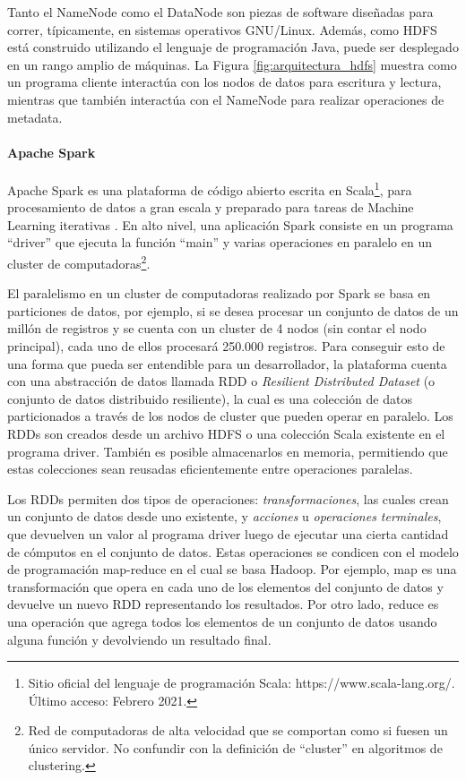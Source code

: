 \bigskip Tanto el NameNode como el DataNode son piezas de software diseñadas para correr, típicamente, en sistemas operativos GNU/Linux. Además, como HDFS está construido utilizando el lenguaje de programación Java, puede ser desplegado en un rango amplio de máquinas. La Figura \ref{fig:arquitectura_hdfs} muestra como un programa cliente interactúa con los nodos de datos para escritura y lectura, mientras que también interactúa con el NameNode para realizar operaciones de metadata.

\paragraph{Apache Spark}
Apache Spark es una plataforma de código abierto escrita en Scala\footnote{Sitio oficial del lenguaje de programación Scala: https://www.scala-lang.org/. Último acceso: Febrero 2021.}, para procesamiento de datos a gran escala y preparado para tareas de Machine Learning iterativas \citep{meng2016mllib}. En alto nivel, una aplicación Spark consiste en un programa “driver” que ejecuta la función “main” y varias operaciones en paralelo en un cluster de computadoras\footnote{Red de computadoras de alta velocidad que se comportan como si fuesen un único servidor. No confundir con la definición de “cluster” en algoritmos de clustering.}.

\bigskip El paralelismo en un cluster de computadoras realizado por Spark se basa en particiones de datos, por ejemplo, si se desea procesar un conjunto de datos de un millón de registros y se cuenta con un cluster de 4 nodos (sin contar el nodo principal), cada uno de ellos procesará 250.000 registros. Para conseguir esto de una forma que pueda ser entendible para un desarrollador, la plataforma cuenta con una abstracción de datos llamada RDD o \textit{Resilient Distributed Dataset} (o conjunto de datos distribuido resiliente), la cual es una colección de datos particionados a través de los nodos de cluster que pueden operar en paralelo. Los RDDs son creados desde un archivo HDFS o una colección Scala existente en el programa driver. También es posible almacenarlos en memoria, permitiendo que estas colecciones sean reusadas eficientemente entre operaciones paralelas.

\bigskip Los RDDs permiten dos tipos de operaciones: \textit{transformaciones}, las cuales crean un conjunto de datos desde uno existente, y \textit{acciones} u \textit{operaciones terminales}, que devuelven un valor al programa driver luego de ejecutar una cierta cantidad de cómputos en el conjunto de datos. Estas operaciones se condicen con el modelo de programación map-reduce en el cual se basa Hadoop. Por ejemplo, map es una transformación que opera en cada uno de los elementos del conjunto de datos y devuelve un nuevo RDD representando los resultados. Por otro lado, reduce es una operación que agrega todos los elementos de un conjunto de datos usando alguna función y devolviendo un resultado final.

